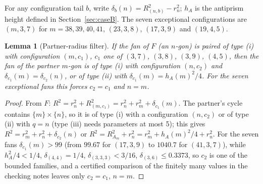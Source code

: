 \documentclass[11pt]{article}
\newtheorem{lemma}[theorem]{Lemma}
\theoremstyle{definition}
\theoremstyle{remark}
\begin{document}
\begin{appendices}
\label{sec:W}
For any configuration tail $b$, write $\delta_b(n)=R_{(n,b)}^2-r_n^2$; $h_A$ is the antiprism height defined in Section~\ref{sec:caseB}. The seven exceptional configurations are $(m,3,7)$ for $m=38,39,40,41$, $(23,3,8)$, $(17,3,9)$ and $(19,4,5)$.\par
\begin{lemma}[Partner-radius filter]\label{lem:partner}
If the fan of $F$ (an $n$-gon) is paired of type (i) with configuration
$(m,c_1)$, $c_1$ one of $(3,7)$, $(3,8)$, $(3,9)$, $(4,5)$, then the fan of the
partner $m$-gon is of type (i) with configuration $(n,c_2)$ and
$\delta_{c_1}(m)=\delta_{c_2}(n)$, or of type (ii) with
$\delta_{c_1}(m)=h_A(m)^2/4$. For the seven exceptional fans this forces
$c_2=c_1$ and $n=m$.
\end{lemma}
\begin{proof}
From $F$: $R^2=r_n^2+R_{(m,c_1)}^2=r_n^2+r_m^2+\delta_{c_1}(m)$. The partner's
cycle contains $\{m\}\times\{n\}$, so it is of type (i) with a configuration
$(n,c_2)$ or of type (ii) with $q=n$ (type (iii) needs parameters at most
5); this gives $R^2=r_m^2+r_n^2+\delta_{c_2}(n)$ or $R^2=R_{A_m}^2+r_n^2=r_m^2+h_A(m)^2/4+r_n^2$.
For the seven fans $\delta_{c_1}(m)>99$ (from $99.67$ for $(17,3,9)$ to
$1040.7$ for $(41,3,7)$), while $h_A^2/4<1/4$,
$\delta_{(4,4)}=1/4$, $\delta_{(3,3,3)}<3/16$, $\delta_{(3,6)}\le0.3373$, so $c_2$ is
one of the bounded families, and a certified comparison of the finitely
many values in the checking notes leaves only
$c_2=c_1$, $n=m$.
\end{proof}


\end{appendices}
\end{document}
